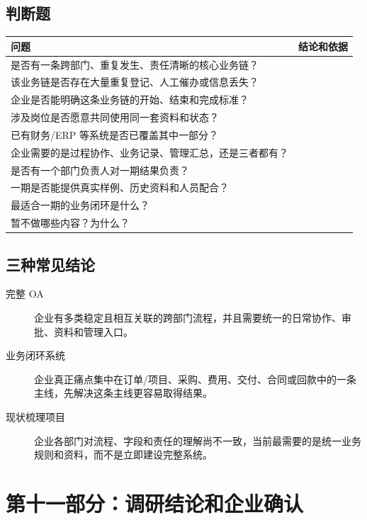 \documentclass[UTF8,a4paper,11pt]{ctexart}
\begin{document}
\subsection{判断题}
\begin{longtable}{p{}p{}}
\toprule
问题 & 结论和依据 \\
\midrule
是否有一条跨部门、重复发生、责任清晰的核心业务链？ & \\
该业务链是否存在大量重复登记、人工催办或信息丢失？ & \\
企业是否能明确这条业务链的开始、结束和完成标准？ & \\
涉及岗位是否愿意共同使用同一套资料和状态？ & \\
已有财务/ERP 等系统是否已覆盖其中一部分？ & \\
企业需要的是过程协作、业务记录、管理汇总，还是三者都有？ & \\
是否有一个部门负责人对一期结果负责？ & \\
一期是否能提供真实样例、历史资料和人员配合？ & \\
最适合一期的业务闭环是什么？ & \\
暂不做哪些内容？为什么？ & \\
\bottomrule
\end{longtable}

\subsection{三种常见结论}
\begin{description}
  \item[完整 OA] 企业有多类稳定且相互关联的跨部门流程，并且需要统一的日常协作、审批、资料和管理入口。
  \item[业务闭环系统] 企业真正痛点集中在订单/项目、采购、费用、交付、合同或回款中的一条主线，先解决这条主线更容易取得结果。
  \item[现状梳理项目] 企业各部门对流程、字段和责任的理解尚不一致，当前最需要的是统一业务规则和资料，而不是立即建设完整系统。
\end{description}

\section{第十一部分：调研结论和企业确认}
\end{document}
